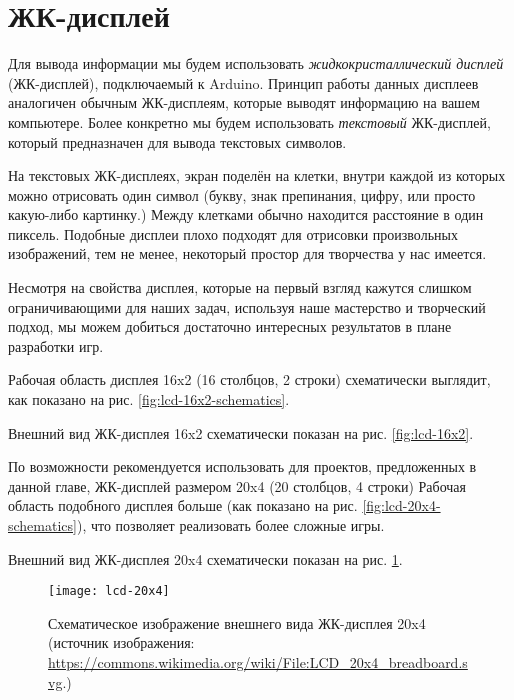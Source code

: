 \documentclass[../sparc.tex]{subfiles}
\begin{document}
\section{ЖК-дисплей}

Для вывода информации мы будем использовать \emph{жидкокристаллический дисплей}
(ЖК-дисплей), подключаемый к Arduino.  Принцип работы данных дисплеев аналогичен
обычным ЖК-дисплеям, которые выводят информацию на вашем компьютере.  Более
конкретно мы будем использовать \emph{текстовый} ЖК-дисплей, который
предназначен для вывода текстовых символов.

На текстовых ЖК-дисплеях, экран поделён на клетки, внутри каждой из которых
можно отрисовать один символ (букву, знак препинания, цифру, или просто
какую-либо картинку.)  Между клетками обычно находится расстояние в один
пиксель.  Подобные дисплеи плохо подходят для отрисовки произвольных
изображений, тем не менее, некоторый простор для творчества у нас имеется.

Несмотря на свойства дисплея, которые на первый взгляд кажутся слишком
ограничивающими для наших задач, используя наше мастерство и творческий подход,
мы можем добиться достаточно интересных результатов в плане разработки игр.

Рабочая область дисплея 16x2 (16 столбцов, 2 строки) схематически выглядит, как
показано на рис. \ref{fig:lcd-16x2-schematics}.


Внешний вид ЖК-дисплея 16x2 схематически показан на рис. \ref{fig:lcd-16x2}.


По возможности рекомендуется использовать для проектов, предложенных в данной
главе, ЖК-дисплей размером 20x4 (20 столбцов, 4 строки) Рабочая область
подобного дисплея больше (как показано на рис. \ref{fig:lcd-20x4-schematics}),
что позволяет реализовать более сложные игры.


Внешний вид ЖК-дисплея 20x4 схематически показан на рис. \ref{fig:lcd-20x4}.

\begin{figure}[h]
  \centering
  \texttt{[image: lcd-20x4]}
  \caption{Схематическое изображение внешнего вида ЖК-дисплея 20x4 (источник
    изображения:
    \url{https://commons.wikimedia.org/wiki/File:LCD_20x4_breadboard.svg}.)}
  \label{fig:lcd-20x4}
\end{figure}
\end{document}
